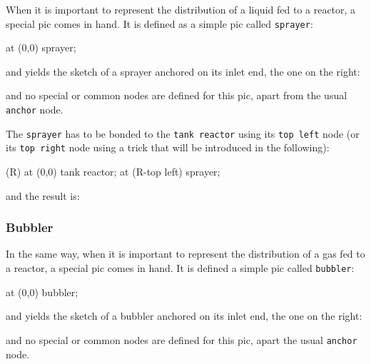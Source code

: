 \documentclass[12pt]{article}						%
\newcommand*{\chpn}[1]{\texttt{#1}}				%
\newcommand*{\chpp}[1]{\texttt{#1}}				%
\begin{document}
When it is important to represent the distribution of a liquid fed to a reactor,
a special pic comes in hand. It is defined as a simple pic called \chpp{sprayer}:
\begin{chpcode}
	\pic at (0,0) {sprayer};
\end{chpcode}
and yields the sketch of a sprayer anchored on its inlet end, the one on the
right:
\begin{center}
\end{center}
and no special or common nodes are defined for this pic, apart from the usual
\chpn{anchor} node.

The \chpp{sprayer} has to be bonded to the \chpp{tank reactor} using its
\chpn{top left} node (or its \chpn{top right} node using a trick that will be
introduced in the following):
\begin{chpcode}
	\pic (R) at (0,0) {tank reactor};
	\pic at (R-top left) {sprayer};
\end{chpcode}
and the result is:
\begin{center}
\end{center}

\subsubsection{Bubbler}

In the same way, when it is important to represent the distribution of a gas fed
to a reactor, a special pic comes in hand. It is defined a simple pic called
\chpp{bubbler}:
\begin{chpcode}
	\pic at (0,0) {bubbler};
\end{chpcode}
and yields the sketch of a bubbler anchored on its inlet end, the one on the
right:
\begin{center}
\end{center}
and no special or common nodes are defined for this pic, apart the usual
\chpn{anchor} node.
\end{document}
